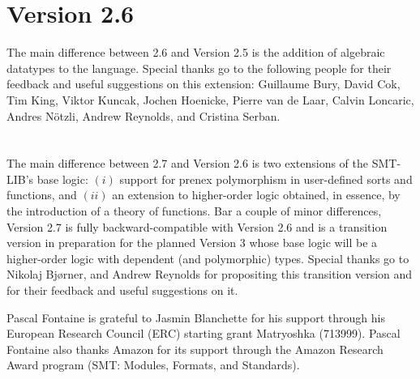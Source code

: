 \section*{Version 2.6}

The main difference between 2.6 and Version 2.5 is the addition of algebraic datatypes to the language.
Special thanks go to the following people
for their feedback and useful suggestions on this extension:
Guillaume Bury,
David Cok,
Tim King,
Viktor Kuncak,
Jochen Hoenicke,
Pierre van de Laar,
Calvin Loncaric,
Andres N{\"o}tzli,
Andrew Reynolds,
and
Cristina Serban.

\section*{\thisversion}

The main difference between 2.7 and Version 2.6 is two extensions of 
the SMT-LIB's base logic:
$(i)$ support for prenex polymorphism in user-defined sorts and functions, and
$(ii)$ an extension to higher-order logic obtained, 
in essence, by the introduction of a theory of functions.
Bar a couple of minor differences,
Version 2.7 is fully backward-compatible with Version 2.6
and is a transition version in preparation for the planned Version 3
whose base logic will be a higher-order logic with dependent (and polymorphic)
types.
Special thanks go to 
Nikolaj Bj{\o}rner, and
Andrew Reynolds for propositing this transition version and 
for their feedback and useful suggestions on it.

Pascal Fontaine is grateful to Jasmin Blanchette for his support through his European Research Council (ERC) starting grant Matryoshka (713999).  Pascal Fontaine also thanks Amazon for its support through the Amazon Research Award program (SMT: Modules, Formats, and Standards).

